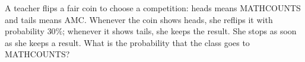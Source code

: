 A teacher flips a fair coin to choose a competition: heads means MATHCOUNTS and tails means AMC. Whenever the coin shows heads, she reflips it with probability $30\%$; whenever it shows tails, she keeps the result. She stops as soon as she keeps a result. What is the probability that the class goes to MATHCOUNTS?
